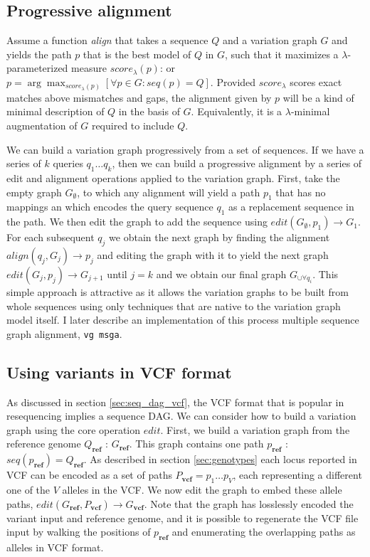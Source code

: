 \subsection{Progressive alignment}
Assume a function \emph{align} that takes a sequence $Q$ and a variation graph $G$ and yields the path $p$ that is the best model of $Q$ in $G$, such that it maximizes a $\lambda$-parameterized measure $score_\lambda(p)$: or $p = \arg\max_{score_\lambda(p)} [\forall p \in G : seq(p) = Q]$.
Provided $score_\lambda$ scores exact matches above mismatches and gaps, the alignment given by $p$ will be a kind of minimal description of $Q$ in the basis of $G$.
Equivalently, it is a $\lambda$-minimal augmentation of $G$ required to include $Q$.

We can build a variation graph progressively from a set of sequences.
If we have a series of $k$ queries $q_1 \ldots q_k$, then we can build a progressive alignment by a series of edit and alignment operations applied to the variation graph.
First, take the empty graph $G_\emptyset$, to which any alignment will yield a path $p_1$ that has no mappings an which encodes the query sequence $q_1$ as a replacement sequence in the path.
We then edit the graph to add the sequence using $edit(G_\emptyset, p_1) \to G_1$.
For each subsequent $q_j$ we obtain the next graph by finding the alignment $align(q_j, G_j) \to p_j$ and editing the graph with it to yield the next graph $edit(G_j, p_j) \to G_{j+1}$ until $j = k$ and we obtain our final graph $G_{\cup \forall q_i}$.
This simple approach is attractive as it allows the variation graphs to be built from whole sequences using only techniques that are native to the variation graph model itself.
I later describe an implementation of this process multiple sequence graph alignment, {\tt vg msga}.

\subsection{Using variants in VCF format}
As discussed in section \ref{sec:seq_dag_vcf}, the VCF format that is popular in resequencing implies a sequence DAG.
We can consider how to build a variation graph using the core operation $edit$.
First, we build a variation graph from the reference genome $Q_\textbf{ref}$ : $G_\textbf{ref}$.
This graph contains one path $p_\textbf{ref}$ : $seq(p_\textbf{ref}) = Q_\textbf{ref}$.
As described in section \ref{sec:genotypes} each locus reported in VCF can be encoded as a set of paths $P_\textbf{vcf} = p_1 \ldots p_V$, each representing a different one of the $V$ alleles in the VCF.
We now edit the graph to embed these allele paths, $edit(G_\textbf{ref}, P_\textbf{vcf}) \to G_\textbf{vcf}$.
Note that the graph has losslessly encoded the variant input and reference genome, and it is possible to regenerate the VCF file input by walking the positions of $p_\textbf{ref}$ and enumerating the overlapping paths as alleles in VCF format.

